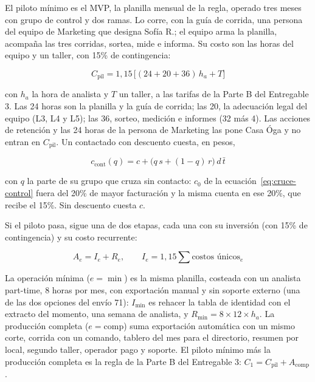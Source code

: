 \documentclass[11pt,a4paper]{article}
\begin{document}
El piloto mínimo es el MVP, la planilla mensual de la regla, operado tres meses con grupo de control y dos ramas. Lo corre, con la guía de corrida, una persona del equipo de Marketing que designa Sofía R.; el equipo arma la planilla, acompaña las tres corridas, sortea, mide e informa. Su costo son las horas del equipo y un taller, con 15\% de contingencia:

\begin{equation*}
C_{\text{pil}} = 1{,}15\,\bigl[(24 + 20 + 36)\,h_a + T\bigr]
\end{equation*}

con $h_a$ la hora de analista y $T$ un taller, a las tarifas de la Parte B del Entregable 3. Las 24 horas son la planilla y la guía de corrida; las 20, la adecuación legal del equipo (L3, L4 y L5); las 36, sorteo, medición e informes (32 más 4). Las acciones de retención y las 24 horas de la persona de Marketing las pone Casa Óga y no entran en $C_{\text{pil}}$. Un contactado con descuento cuesta, en pesos,

\begin{equation*}
c_{\text{cont}}(q) = c + \bigl(q\,s + (1-q)\,r\bigr)\,d\,\bar t
\end{equation*}

con $q$ la parte de su grupo que cruza sin contacto: $c_0$ de la ecuación~\eqref{eq:cruce-control} fuera del 20\% de mayor facturación y la misma cuenta en ese 20\%, que recibe el 15\%. Sin descuento cuesta $c$.

Si el piloto pasa, sigue una de dos etapas, cada una con su inversión (con 15\% de contingencia) y su costo recurrente:

\begin{equation*}
A_e = I_e + R_e, \qquad I_e = 1{,}15 \sum \text{costos únicos}_e
\end{equation*}

La operación mínima ($e = \min$) es la misma planilla, costeada con un analista part-time, 8 horas por mes, con exportación manual y sin soporte externo (una de las dos opciones del envío 71): $I_{\min}$ es rehacer la tabla de identidad con el extracto del momento, una semana de analista, y $R_{\min} = 8 \times 12 \times h_a$. La producción completa ($e = \text{comp}$) suma exportación automática con un mismo corte, corrida con un comando, tablero del mes para el directorio, resumen por local, segundo taller, operador pago y soporte. El piloto mínimo más la producción completa es la regla de la Parte B del Entregable 3: $C_1 = C_{\text{pil}} + A_{\text{comp}}$.
\end{document}
